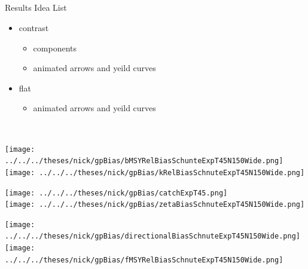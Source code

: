 \documentclass[ xcolor = pdftex, dvipsnames, table ]{beamer}
\begin{document}
\subsection{}

\begin{frame}{\color{orange}Results Idea List}
\begin{itemize}
\item contrast
	\begin{itemize}
		\item components
		\item animated arrows and yeild curves
	\end{itemize}
\item flat
\begin{itemize}
	\item animated arrows and yeild curves
\end{itemize}
\end{itemize}
\end{frame}

%
\begin{frame}%
$~$
\hspace*{-1.25cm}
\begin{minipage}[h!]{0.33\textwidth}
\hspace*{0.25cm}
\texttt{[image: ../../../theses/nick/gpBias/bMSYRelBiasSchunteExpT45N150Wide.png]}\\
\hspace*{0.25cm}
\texttt{[image: ../../../theses/nick/gpBias/kRelBiasSchnuteExpT45N150Wide.png]}
\end{minipage}
\begin{minipage}[h!]{0.33\textwidth}
\hspace*{0.75cm}
\texttt{[image: ../../../theses/nick/gpBias/catchExpT45.png]}\\
\hspace*{0.75cm}
\texttt{[image: ../../../theses/nick/gpBias/zetaBiasSchnuteExpT45N150Wide.png]}
\end{minipage}
\begin{minipage}[h!]{0.33\textwidth}
\hspace*{1cm}
\texttt{[image: ../../../theses/nick/gpBias/directionalBiasSchnuteExpT45N150Wide.png]}\\
\hspace*{1cm}
\texttt{[image: ../../../theses/nick/gpBias/fMSYRelBiasSchnuteExpT45N150Wide.png]}
\end{minipage}
\end{frame}
\end{document}

